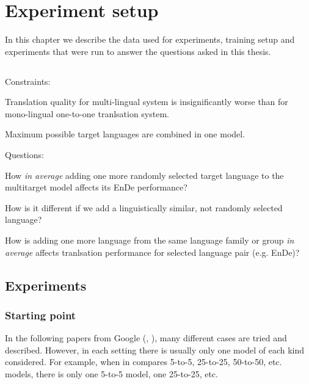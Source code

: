 \chapter{Experiment setup}
\label{chapter:experiment_setup}

In this chapter we describe the data used for experiments, training setup
and experiments that were run to answer the questions asked in this thesis.

\section{}
\label{section:questions_and_constraints}

Constraints:
\begin{displayquote}
	Translation quality for multi-lingual system is insignificantly worse than for
	mono-lingual one-to-one tranlsation system.

	Maximum possible target languages are combined in one model.
\end{displayquote}

Questions:
\begin{displayquote}
	How \emph{in average} adding one more randomly selected target language
	to the multitarget model affects its En\to{}De performance?

	How is it different if we add a linguistically similar, not randomly selected language?

	How is adding one more language from the same language family or group 
	\emph{in average} affects tranlsation performance for selected language
	pair (e.g. En\to{}De)?
\end{displayquote}



\section{Experiments}
\label{section:experiments}
\subsection{Starting point}
\label{subsection:starting_point}


In the following papers from Google
(, ),
many different cases are tried and described.
However, in each setting there is usually only one model of each kind considered.
For example, when in \citet{aharoni-etal-2019-massively} compares 5-to-5,
25-to-25, 50-to-50, etc. models, there is only one 5-to-5 model, one 25-to-25, etc.

